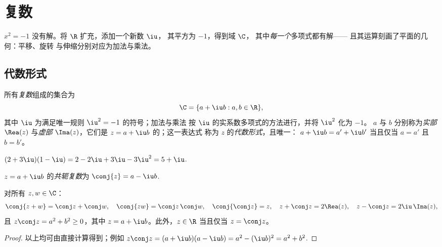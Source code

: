 \chapter{复数}\label{ch:g12:complex}

 $x^2 = -1$ 没有解。将 $\R$ 扩充，添加一个新数 $\iu$，
其平方为 $-1$，得到域 $\C$，
其中\emph{每一个}多项式都有解——
且其运算刻画了平面的几何：平移、旋转
与伸缩分别对应为加法与乘法。

\section{代数形式}

\begin{definition}[复数]\label{def:g12:complex:def}
所有\emph{复数}组成的集合为
\[
\C = \{a + \iu b : a, b \in \R\},
\]
其中 $\iu$ 为满足唯一规则 $\iu^2 = -1$ 的符号；加法与乘法
按 $\iu$ 的实系数多项式的方法进行，并将 $\iu^2$ 化为 $-1$。
 $a$ 与 $b$ 分别称为\emph{实部}
$\Rea(z)$ 与\emph{虚部} $\Ima(z)$，它们是 $z = a + \iu b$ 的；这一表达式
称为 $z$ 的\emph{代数形式}，且唯一：
$a + \iu b = a' + \iu b'$ 当且仅当 $a = a'$ 且 $b = b'$。
\end{definition}

\begin{example}
$(2 + 3\iu)(1 - \iu) = 2 - 2\iu + 3\iu - 3\iu^2 = 5 + \iu$.
\end{example}

\begin{definition}[共轭复数]\label{def:g12:complex:conjugate}
$z = a + \iu b$ 的\emph{共轭复数}为
$\conj{z} = a - \iu b$.
\end{definition}

\begin{proposition}[共轭运算的性质]\label{prop:g12:complex:conjugate}
对所有 $z, w \in \C$：
\[
\conj{z + w} = \conj z + \conj w, \quad
\conj{zw} = \conj z\,\conj w, \quad
\conj{\conj z} = z, \quad
z + \conj z = 2\Rea(z), \quad
z - \conj z = 2\iu\,\Ima(z),
\]
且 $z\conj z = a^2 + b^2 \geq 0$，其中 $z = a + \iu b$。此外，$z \in \R$
当且仅当 $z = \conj z$。
\end{proposition}

\begin{proof}
以上均可由直接计算得到；例如
$z\conj z = (a + \iu b)(a - \iu b) = a^2 - (\iu b)^2 = a^2 + b^2$.
\end{proof}

